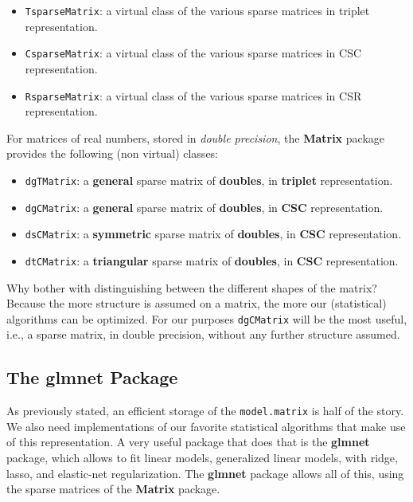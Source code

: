 \documentclass[]{book}
\providecommand{\tightlist}{%
  \setlength{\itemsep}{0pt}\setlength{\parskip}{0pt}}
\theoremstyle{definition}
\theoremstyle{definition}
\theoremstyle{definition}
\theoremstyle{remark}
\begin{document}
\begin{itemize}
\tightlist
\item
  \texttt{TsparseMatrix}: a virtual class of the various sparse matrices in triplet representation.
\item
  \texttt{CsparseMatrix}: a virtual class of the various sparse matrices in CSC representation.
\item
  \texttt{RsparseMatrix}: a virtual class of the various sparse matrices in CSR representation.
\end{itemize}

For matrices of real numbers, stored in \emph{double precision}, the \textbf{Matrix} package provides the following (non virtual) classes:

\begin{itemize}
\tightlist
\item
  \texttt{dgTMatrix}: a \textbf{general} sparse matrix of \textbf{doubles}, in \textbf{triplet} representation.
\item
  \texttt{dgCMatrix}: a \textbf{general} sparse matrix of \textbf{doubles}, in \textbf{CSC} representation.
\item
  \texttt{dsCMatrix}: a \textbf{symmetric} sparse matrix of \textbf{doubles}, in \textbf{CSC} representation.
\item
  \texttt{dtCMatrix}: a \textbf{triangular} sparse matrix of \textbf{doubles}, in \textbf{CSC} representation.
\end{itemize}

Why bother with distinguishing between the different shapes of the matrix?
Because the more structure is assumed on a matrix, the more our (statistical) algorithms can be optimized.
For our purposes \texttt{dgCMatrix} will be the most useful, i.e., a sparse matrix, in double precision, without any further structure assumed.

\hypertarget{the-glmnet-package}{%
\subsection{The glmnet Package}\label{the-glmnet-package}}

As previously stated, an efficient storage of the \texttt{model.matrix} is half of the story.
We also need implementations of our favorite statistical algorithms that make use of this representation.
A very useful package that does that is the \textbf{glmnet} package, which allows to fit linear models, generalized linear models, with ridge, lasso, and elastic-net regularization.
The \textbf{glmnet} package allows all of this, using the sparse matrices of the \textbf{Matrix} package.
\end{document}
